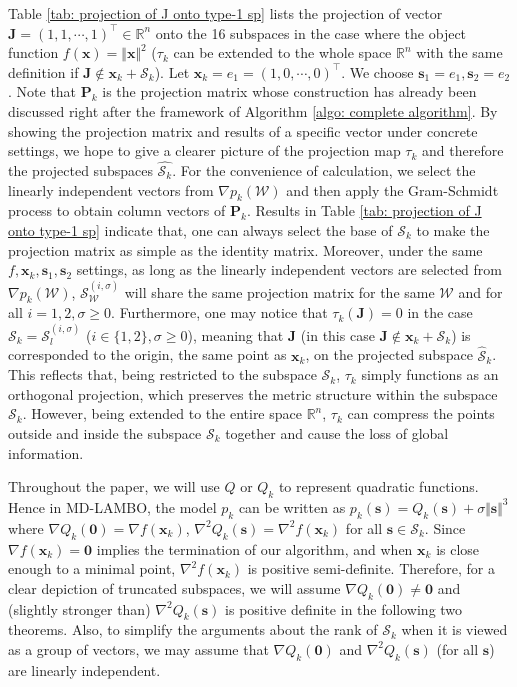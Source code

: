 \documentclass[colorlinks=true, linkcolor=blue, citecolor=blue, urlcolor=blue]{article}
\theoremstyle{plain}
\theoremstyle{definition}
\theoremstyle{remark}
\newcommand{\RR}{\mathbb{R}}
\begin{document}
Table \ref{tab: projection of J onto type-1 sp} lists the projection of vector $\bm J=(1,1,\cdots,1)^\top\in\mathbb{R}^n$ onto the 16 subspaces in the case where the object function $f(\bm x)=\Vert \bm x\Vert^2$ ($\tau_k$ can be extended to the whole space $\RR^n$ with the same definition if $\bm J\notin\bm x_k+\mathcal{S}_k$). Let $\bm x_k=e_1=(1,0,\cdots,0)^\top.$ We choose $ \bm s_1=e_1,\bm s_2=e_2$. Note that $\bm P_k$ is the projection matrix whose construction has already been discussed right after the framework of Algorithm \ref{algo: complete algorithm}. By showing the projection matrix and results of a specific vector under concrete settings, we hope to give a clearer picture of the projection map $\tau_k$ and therefore the projected subspaces $\hat{\mathcal{S}_k}$. For the convenience of calculation, we select the linearly independent vectors from $\nabla p_k(\mathcal{W})$ and then apply the Gram-Schmidt process to obtain column vectors of $\bm P_k$. Results in Table \ref{tab: projection of J onto type-1 sp} indicate that, one can always select the base of $\mathcal{S}_k$ to make the projection matrix as simple as the identity matrix. Moreover, under the same $f,\bm x_k,\bm s_1,\bm s_2$ settings, as long as the linearly independent vectors are selected from $\nabla p_k(\mathcal{W})$, $\mathcal{S}_\mathcal{W}^{(i,\sigma)}$ will share the same projection matrix for the same $\mathcal{W}$ and for all $i=1,2,\sigma\geq 0$. Furthermore, one may notice that $\tau_k(\bm J)=0$ in the case $\mathcal{S}_k=\mathcal{S}_l^{(i,\sigma)}$ ($i\in\{1,2\},\sigma\geq 0$), meaning that $\bm J$ (in this case $\bm J\notin\bm x_k+\mathcal{S}_k$) is corresponded to the origin, the same point as $\bm x_k$, on the projected subspace $\hat{\mathcal{S}}_k$. This reflects that, being restricted to the subspace $\mathcal{S}_k$, $\tau_k$ simply functions as an orthogonal projection, which preserves the metric structure within the subspace $\mathcal{S}_k$. However, being extended to the entire space $\RR^n$, $\tau_k$ can compress the points outside and inside the subspace $\mathcal{S}_k$ together and cause the loss of global information.

Throughout the paper, we will use $Q$ or $Q_k$ to represent quadratic functions. Hence in MD-LAMBO, the model $p_k$ can be written as $p_k(\bm s)=Q_k(\bm s)+\sigma\Vert \bm s\Vert^3$ where $\nabla Q_k(\bm 0)=\nabla f(\bm x_k)$, $\nabla^2Q_k(\bm s)=\nabla^2 f(\bm x_k)$ for all $\bm s\in\mathcal{S}_k$. Since $\nabla f(\bm x_k)=\bm 0$ implies the termination of our algorithm, and when $\bm x_k$ is close enough to a minimal point, $\nabla^2 f(\bm x_k)$ is positive semi-definite. Therefore, for a clear depiction of truncated subspaces, we will assume $\nabla Q_k(\bm 0)\neq \bm 0$ and (slightly stronger than) $\nabla^2 Q_k(\bm s)$ is positive definite in the following two theorems. Also, to simplify the arguments about the rank of $\mathcal{S}_k$ when it is viewed as a group of vectors, we may assume that $\nabla Q_k(\bm 0)$ and $\nabla^2 Q_k(\bm s)$ (for all $\bm s$) are linearly independent. 
\end{document}
